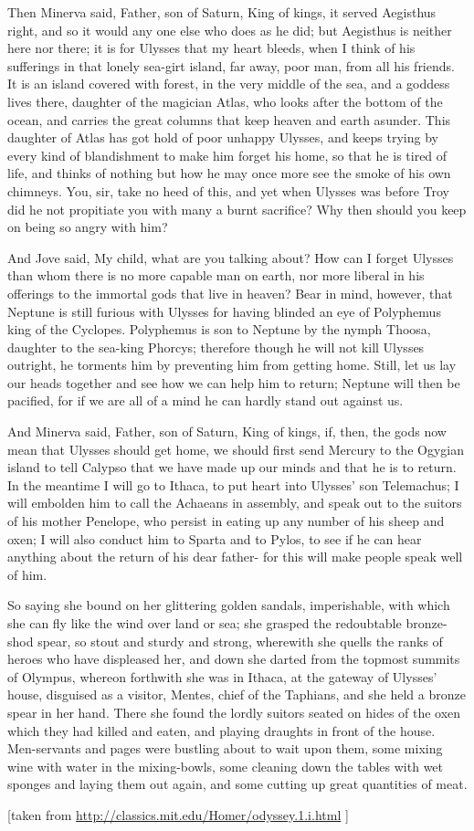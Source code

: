 {    Then Minerva said, Father, son of Saturn, King of kings, it served Aegisthus right, and so it would any one else who does as he did; but Aegisthus is neither here nor there; it is for Ulysses that my heart bleeds, when I think of his sufferings in that lonely sea-girt island, far away, poor man, from all his friends. It is an island covered with forest, in the very middle of the sea, and a goddess lives there, daughter of the magician Atlas, who looks after the bottom of the ocean, and carries the great columns that keep heaven and earth asunder. This daughter of Atlas has got hold of poor unhappy Ulysses, and keeps trying by every kind of blandishment to make him forget his home, so that he is tired of life, and thinks of nothing but how he may once more see the smoke of his own chimneys. You, sir, take no heed of this, and yet when Ulysses was before Troy did he not propitiate you with many a burnt sacrifice? Why then should you keep on being so angry with him?
    
    And Jove said, My child, what are you talking about? How can I forget Ulysses than whom there is no more capable man on earth, nor more liberal in his offerings to the immortal gods that live in heaven? Bear in mind, however, that Neptune is still furious with Ulysses for having blinded an eye of Polyphemus king of the Cyclopes. Polyphemus is son to Neptune by the nymph Thoosa, daughter to the sea-king Phorcys; therefore though he will not kill Ulysses outright, he torments him by preventing him from getting home. Still, let us lay our heads together and see how we can help him to return; Neptune will then be pacified, for if we are all of a mind he can hardly stand out against us.
    
    And Minerva said, Father, son of Saturn, King of kings, if, then, the gods now mean that Ulysses should get home, we should first send Mercury to the Ogygian island to tell Calypso that we have made up our minds and that he is to return. In the meantime I will go to Ithaca, to put heart into Ulysses' son Telemachus; I will embolden him to call the Achaeans in assembly, and speak out to the suitors of his mother Penelope, who persist in eating up any number of his sheep and oxen; I will also conduct him to Sparta and to Pylos, to see if he can hear anything about the return of his dear father- for this will make people speak well of him.
    
    So saying she bound on her glittering golden sandals, imperishable, with which she can fly like the wind over land or sea; she grasped the redoubtable bronze-shod spear, so stout and sturdy and strong, wherewith she quells the ranks of heroes who have displeased her, and down she darted from the topmost summits of Olympus, whereon forthwith she was in Ithaca, at the gateway of Ulysses' house, disguised as a visitor, Mentes, chief of the Taphians, and she held a bronze spear in her hand. There she found the lordly suitors seated on hides of the oxen which they had killed and eaten, and playing draughts in front of the house. Men-servants and pages were bustling about to wait upon them, some mixing wine with water in the mixing-bowls, some cleaning down the tables with wet sponges and laying them out again, and some cutting up great quantities of meat. 

    [taken from \url{http://classics.mit.edu/Homer/odyssey.1.i.html} ]

}